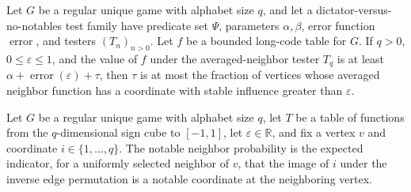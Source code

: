 \begin{theorem}
\label{FABL.RegularUniqueGame.excess_le_boundedNeighborNotableVertexFraction}
\leanok
{}
Let $G$ be a regular unique game with alphabet size $q$, and let a dictator-versus-no-notables test family have predicate set $\Psi$, parameters $\alpha,\beta$, error function $\operatorname{error}$, and testers $(T_n)_{n>0}$. Let $f$ be a bounded long-code table for $G$. If $q>0$, $0\leq\varepsilon\leq1$, and the value of $f$ under the averaged-neighbor tester $T_q$ is at least $\alpha+\operatorname{error}(\varepsilon)+\tau$, then $\tau$ is at most the fraction of vertices whose averaged neighbor function has a coordinate with stable influence greater than $\varepsilon$.
\end{theorem}

\begin{definition}
\label{FABL.RegularUniqueGame.boundedNotableNeighborProbability}
\leanok
{}
Let $G$ be a regular unique game with alphabet size $q$, let $T$ be a table of functions
from the $q$-dimensional sign cube to $[-1,1]$, let $\varepsilon\in\mathbb R$, and fix a
vertex $v$ and coordinate $i\in\{1,\ldots,q\}$. The notable neighbor probability is the
expected indicator, for a uniformly selected neighbor of $v$, that the image of $i$
under the inverse edge permutation is a notable coordinate at the neighboring vertex.
\end{definition}


